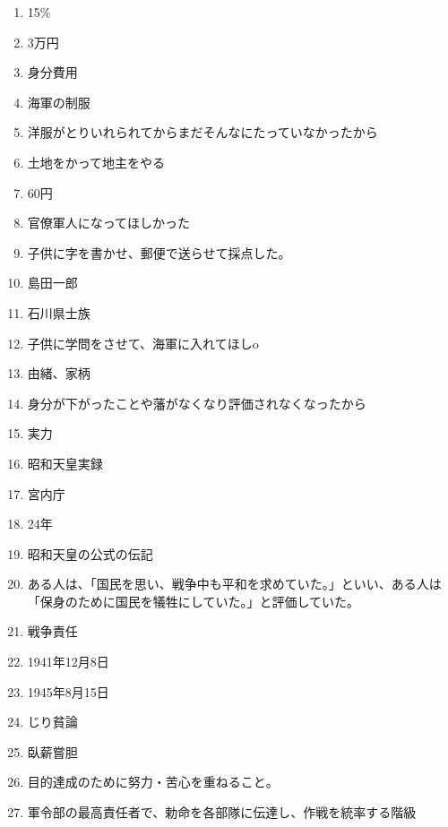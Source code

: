 \documentclass[]{jsarticle}
\begin{document}
\begin{enumerate}
	\item 15\%
	\item 3万円
	\item 身分費用
	\item 海軍の制服
	\item 洋服がとりいれられてからまだそんなにたっていなかったから
	\item 土地をかって地主をやる
	\item 60円
	\item 官僚軍人になってほしかった
	\item 子供に字を書かせ、郵便で送らせて採点した。
	\item 島田一郎
	\item 石川県士族
	\item 子供に学問をさせて、海軍に入れてほしo
	\item 由緒、家柄
	\item 身分が下がったことや藩がなくなり評価されなくなったから
	\item 実力
	      \\
	\item 昭和天皇実録
	\item 宮内庁
	\item 24年
	\item 昭和天皇の公式の伝記
	\item ある人は、「国民を思い、戦争中も平和を求めていた。」といい、ある人は「保身のために国民を犠牲にしていた。」と評価していた。
	\item 戦争責任
	\item 1941年12月8日
	\item 1945年8月15日
	\item じり貧論
	\item 臥薪嘗胆
	\item 目的達成のために努力・苦心を重ねること。
	\item 軍令部の最高責任者で、勅命を各部隊に伝達し、作戦を統率する階級
\end{enumerate}
\end{document}
